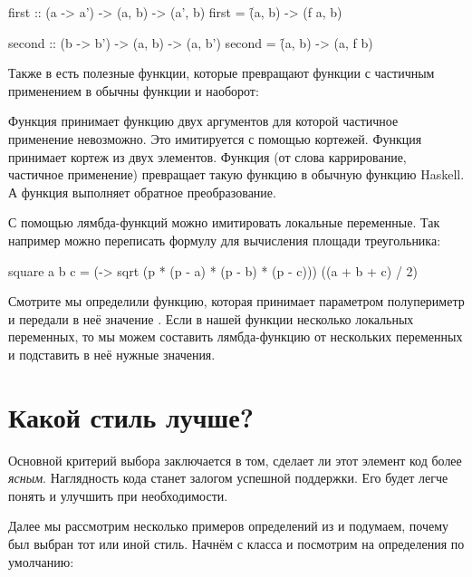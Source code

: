 \begin{code}
first :: (a -> a') -> (a, b) -> (a', b)
first = \f (a, b) -> (f a, b)

second :: (b -> b') -> (a, b) -> (a, b')
second = \f (a, b) -> (a, f b)
\end{code}

Также в  есть полезные функции, которые превращают функции с
частичным применением в обычны функции и наоборот:



Функция  принимает функцию двух аргументов для которой
частичное применение невозможно. Это имитируется с помощью кортежей.
Функция принимает кортеж из двух элементов. Функция  (от слова
каррирование, частичное применение) превращает такую функцию в обычную
функцию Haskell. А функция  выполняет обратное
преобразование.

С помощью лямбда-функций можно имитировать локальные переменные. Так
например можно переписать формулу для вычисления площади треугольника:


\begin{code}
square a b c = 
    (\p -> sqrt (p * (p - a) * (p - b) * (p - c))) 
    ((a + b + c) / 2)
\end{code}

Смотрите мы определили функцию, которая принимает параметром
полупериметр  и передали в неё значение .
Если в нашей функции несколько локальных переменных, то мы можем
составить лямбда-функцию от нескольких переменных и подставить в неё
нужные значения.

\section{Какой стиль лучше?}

Основной критерий выбора заключается в том, сделает ли этот элемент код
более \emph{ясным}. Наглядность кода станет залогом успешной поддержки.
Его будет легче понять и улучшить при необходимости.

Далее мы рассмотрим несколько примеров определений из  и
подумаем, почему был выбран тот или иной стиль. Начнём с класса 
и посмотрим на определения по умолчанию:



